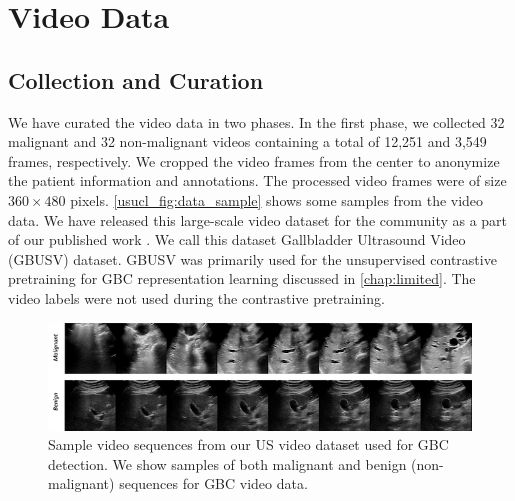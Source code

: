 \section{Video Data}
\label{data:gbusv}
%
\subsection{Collection and Curation}
We have curated the video data in two phases. In the first phase, we collected 32 malignant and 32 non-malignant videos containing a total of 12,251 and 3,549 frames, respectively. 
We cropped the video frames from the center to anonymize the patient information and annotations. The processed video frames were of size $360\!\times\!480$ pixels. \cref{usucl_fig:data_sample} shows some samples from the video data. We have released this large-scale video dataset for the community as a part of our published work \cite{basu2022unsupervised}. We call this dataset Gallbladder Ultrasound Video (GBUSV) dataset. GBUSV was primarily used for the unsupervised contrastive pretraining for GBC representation learning discussed in \cref{chap:limited}. The video labels were not used during the contrastive pretraining.



\begin{figure}[t]
    \centering
    \includegraphics[width=\linewidth]{figs/focusmae/us_video.png}
    \caption[Video data samples]{Sample video sequences from our US video dataset used for GBC detection. We show samples of both malignant and benign (non-malignant) sequences for GBC video data. }
    \label{fig:video_data_sample}
\end{figure}

